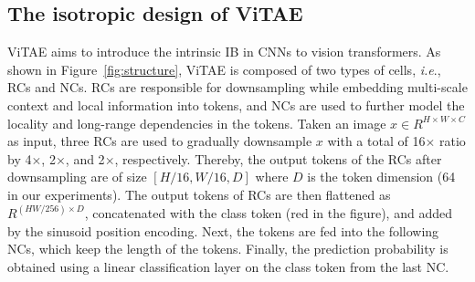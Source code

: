 \documentclass[twocolumn]{svjour3}          \smartqed  \usepackage{natbib}
\newcommand{\ie}{i.e}
\def\onedot{.\xspace}
\def\ie{\emph{i.e}\onedot}
\begin{document}
\subsection{The isotropic design of ViTAE}
ViTAE aims to introduce the intrinsic IB in CNNs to vision transformers. As shown in Figure~\ref{fig:structure}, ViTAE is composed of two types of cells, \ie, RCs and NCs. RCs are responsible for downsampling while embedding multi-scale context and local information into tokens, and NCs are used to further model the locality and long-range dependencies in the tokens. Taken an image $x \in R^{H \times W \times C}$ as input, three RCs are used to gradually downsample $x$ with a total of 16$\times$ ratio by 4$\times$, 2$\times$, and 2$\times$, respectively. Thereby, the output tokens of the RCs after downsampling are of size $[H/16, W/16, D]$ where $D$ is the token dimension (64 in our experiments). The output tokens of RCs are then flattened as $R^{(HW/256) \times D}$, concatenated with the class token (red in the figure), and added by the sinusoid position encoding. Next, the tokens are fed into the following NCs, which keep the length of the tokens. Finally, the prediction probability is obtained using a linear classification layer on the class token from the last NC.
\end{document}
